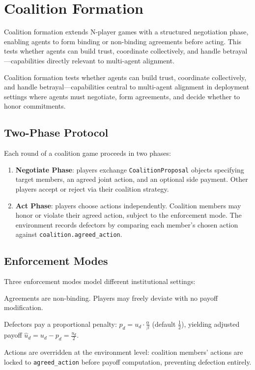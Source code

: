
\section{Coalition Formation}
\label{sec:coalition}

Coalition formation extends N-player games with a structured negotiation phase,
enabling agents to form binding or non-binding agreements before acting. This
tests whether agents can build trust, coordinate collectively, and handle
betrayal---capabilities directly relevant to multi-agent alignment.

Coalition formation tests whether agents can build trust, coordinate
collectively, and handle betrayal---capabilities central to multi-agent
alignment in deployment settings where agents must negotiate, form
agreements, and decide whether to honor commitments.

\subsection{Two-Phase Protocol}
\label{sec:coalition-protocol}

Each round of a coalition game proceeds in two phases:

\begin{enumerate}[nosep]
    \item \textbf{Negotiate Phase}: players exchange \texttt{CoalitionProposal}
          objects specifying target members, an agreed joint action, and an optional
          side payment. Other players accept or reject via their coalition strategy.
    \item \textbf{Act Phase}: players choose actions independently. Coalition
          members may honor or violate their agreed action, subject to the
          enforcement mode. The environment records defectors by comparing
          each member's chosen action against \texttt{coalition.agreed\_action}.
\end{enumerate}

\subsection{Enforcement Modes}
\label{sec:enforcement}

Three enforcement modes model different institutional settings:

\begin{description}[nosep]
    \item[Cheap Talk.] Agreements are non-binding. Players may freely
        deviate with no payoff modification.
    \item[Penalty.] Defectors pay a proportional penalty:
        $p_d = u_d \cdot \frac{\alpha}{\beta}$ (default $\frac{1}{2}$),
        yielding adjusted payoff $\hat{u}_d = u_d - p_d = \frac{u_d}{2}$.
    \item[Binding.] Actions are overridden at the environment level:
        coalition members' actions are locked to \texttt{agreed\_action}
        before payoff computation, preventing defection entirely.
\end{description}

